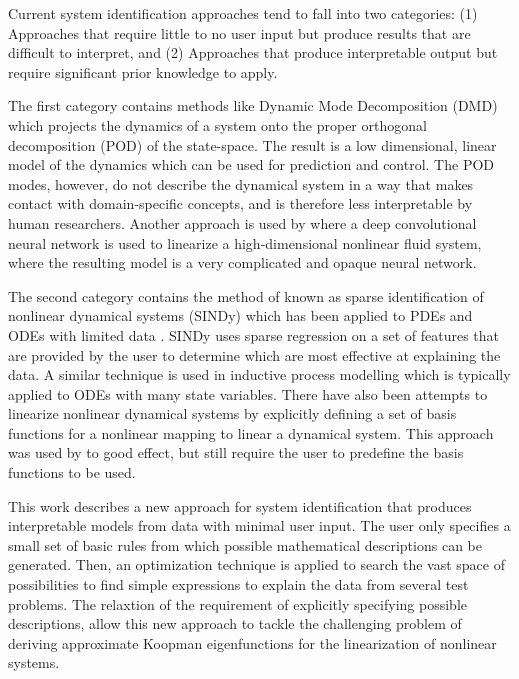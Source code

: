 \documentclass{article}
\begin{document}
 Current system identification approaches tend to fall into two categories: (1) Approaches that require little to no user input but produce results that are difficult to interpret, and (2) Approaches that produce interpretable output but require significant prior knowledge to apply.

The first category contains methods like Dynamic Mode Decomposition (DMD) \cite{schmid2010dynamic, kutz2016dynamic} which projects the dynamics of a system onto the proper orthogonal decomposition (POD) of the state-space. The result is a low dimensional, linear model of the dynamics which can be used for prediction and control. The POD modes, however, do not describe the dynamical system in a way that makes contact with domain-specific concepts, and is therefore less interpretable by human researchers. Another approach is used by \cite{morton2018deep} where a deep convolutional neural network is used to linearize a high-dimensional nonlinear fluid system, where the resulting model is a very complicated and opaque neural network.

The second category contains the method of \cite{brunton2016discovering} known as sparse identification of nonlinear dynamical systems (SINDy) which has been applied to PDEs \cite{rudy2017data} and ODEs with limited data \cite{kaiser2018sparse}. SINDy uses sparse regression on a set of features that are provided by the user to determine which are most effective at explaining the data. A similar technique is used in inductive process modelling \cite{bridewell2008inductive, langley2006constructing} which is typically applied to ODEs with many state variables. There have also been attempts to linearize nonlinear dynamical systems by explicitly defining a set of basis functions for a nonlinear mapping to linear a dynamical system. This approach was used by \cite{williams2015data, johnson2018class} to good effect, but still require the user to predefine the basis functions to be used. 

This work describes a new approach for system identification that produces interpretable models from data with minimal user input. The user only specifies a small set of basic rules from which possible mathematical descriptions can be generated. Then, an optimization technique is applied to search the vast space of possibilities to find simple expressions to explain the data from several test problems. The relaxtion of the requirement of explicitly specifying possible descriptions, allow this new approach to tackle the challenging problem of deriving approximate Koopman eigenfunctions for the linearization of nonlinear systems.
\end{document}
